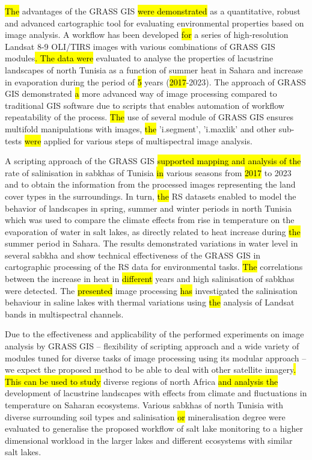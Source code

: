 \documentclass[land,article,submit,pdftex,moreauthors]{Definitions/mdpi}
\begin{document}
\hl{The} advantages of the GRASS GIS \hl{were demonstrated }as a quantitative, robust and advanced cartographic tool for evaluating environmental properties based on image analysis. A workflow has been developed \hl{for} a series of high-resolution Landsat 8-9 OLI/TIRS images with various combinations of GRASS GIS modules\hl{. The data were }evaluated to analyse the properties of lacustrine landscapes of north Tunisia as a function of summer heat in Sahara and increase in evaporation during the period of \hl{5} years (\hl{2017}-2023). The approach of GRASS GIS demonstrated \hl{a }more advanced way of image processing compared to traditional GIS software due to scripts that enables automation of workflow repeatability of the process. \hl{The} use of several module of GRASS GIS ensures multifold manipulations with images, \hl{the} 'i.segment', 'i.maxlik' and other sub-tests\hl{ were} applied for various steps of multispectral image analysis. 

A scripting approach of the GRASS GIS \hl{supported mapping and analysis of the} rate of salinisation in sabkhas of Tunisia \hl{in} various seasons from \hl{2017} to 2023 and to obtain the information from the processed images representing the land cover types in the surroundings. In turn, \hl{the }RS datasets enabled to model the behavior of landscapes in spring, summer and winter periods in north Tunisia which was used to compare the climate effects from rise in temperature on the evaporation of water in salt lakes, as directly related to heat increase during \hl{the }summer period in Sahara. The results demonstrated variations in water level in several sabkha and show technical effectiveness of the GRASS GIS in cartographic processing of the RS data for environmental tasks. \hl{The }correlations between the increase in heat in \hl{different} years and high salinisation of sabkhas were detected. The \hl{presented }image processing \hl{has} investigated the salinisation behaviour in saline lakes with thermal variations using \hl{the }analysis of Landsat bands in multispectral channels. 

Due to the effectiveness and applicability of the performed experiments on image analysis by GRASS GIS -- flexibility of scripting approach and a wide variety of modules tuned for diverse tasks of image processing using its modular approach -- we expect the proposed method to be able to deal with other satellite imagery\hl{. This can be used to study} diverse regions of north Africa \hl{and analysis the }development of lacustrine landscapes with effects from climate and fluctuations in temperature on Saharan ecosystems. Various sabkhas of north Tunisia with diverse surrounding soil types and salinisation \hl{or} mineralisation degree were evaluated to generalise the proposed workflow of salt lake monitoring to a higher dimensional workload in the larger lakes and different\hl{ }ecosystems with similar salt lakes. 
\end{document}

